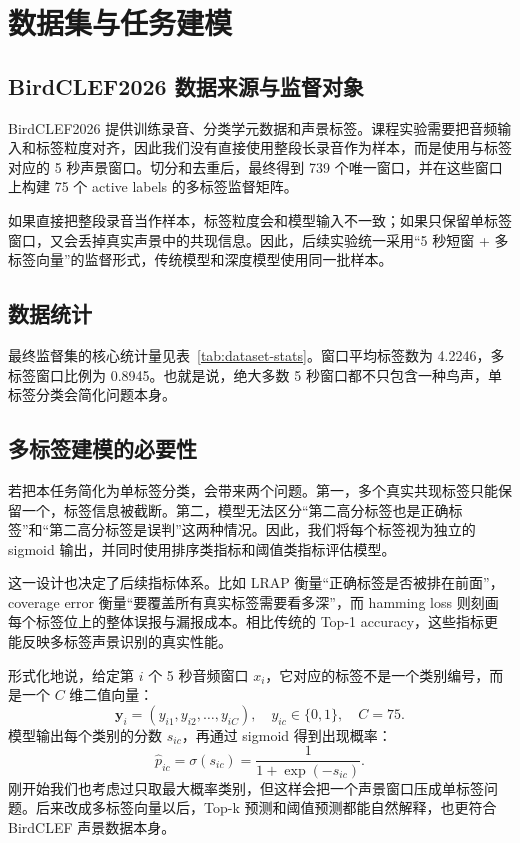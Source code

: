 \documentclass[12pt,a4paper]{article}
\begin{document}
\section{数据集与任务建模}

\subsection{BirdCLEF2026 数据来源与监督对象}
BirdCLEF2026 提供训练录音、分类学元数据和声景标签。课程实验需要把音频输入和标签粒度对齐，因此我们没有直接使用整段长录音作为样本，而是使用与标签对应的 5 秒声景窗口。切分和去重后，最终得到 739 个唯一窗口，并在这些窗口上构建 75 个 active labels 的多标签监督矩阵。

如果直接把整段录音当作样本，标签粒度会和模型输入不一致；如果只保留单标签窗口，又会丢掉真实声景中的共现信息。因此，后续实验统一采用“5 秒短窗 + 多标签向量”的监督形式，传统模型和深度模型使用同一批样本。

\subsection{数据统计}
最终监督集的核心统计量见表~\ref{tab:dataset-stats}。窗口平均标签数为 4.2246，多标签窗口比例为 0.8945。也就是说，绝大多数 5 秒窗口都不只包含一种鸟声，单标签分类会简化问题本身。

\begin{table}[H]
\centering

\caption{监督数据集核心统计量}
\label{tab:dataset-stats}
\end{table}

\subsection{多标签建模的必要性}
若把本任务简化为单标签分类，会带来两个问题。第一，多个真实共现标签只能保留一个，标签信息被截断。第二，模型无法区分“第二高分标签也是正确标签”和“第二高分标签是误判”这两种情况。因此，我们将每个标签视为独立的 sigmoid 输出，并同时使用排序类指标和阈值类指标评估模型。

这一设计也决定了后续指标体系。比如 LRAP 衡量“正确标签是否被排在前面”，coverage error 衡量“要覆盖所有真实标签需要看多深”，而 hamming loss 则刻画每个标签位上的整体误报与漏报成本。相比传统的 Top-1 accuracy，这些指标更能反映多标签声景识别的真实性能。

形式化地说，给定第 $i$ 个 5 秒音频窗口 $x_i$，它对应的标签不是一个类别编号，而是一个 $C$ 维二值向量：
\begin{equation}
\mathbf{y}_i=(y_{i1},y_{i2},\ldots,y_{iC}),\quad y_{ic}\in\{0,1\},\quad C=75.
\end{equation}
模型输出每个类别的分数 $s_{ic}$，再通过 sigmoid 得到出现概率：
\begin{equation}
\hat{p}_{ic}=\sigma(s_{ic})=\frac{1}{1+\exp(-s_{ic})}.
\end{equation}
刚开始我们也考虑过只取最大概率类别，但这样会把一个声景窗口压成单标签问题。后来改成多标签向量以后，Top-k 预测和阈值预测都能自然解释，也更符合 BirdCLEF 声景数据本身。
\end{document}

